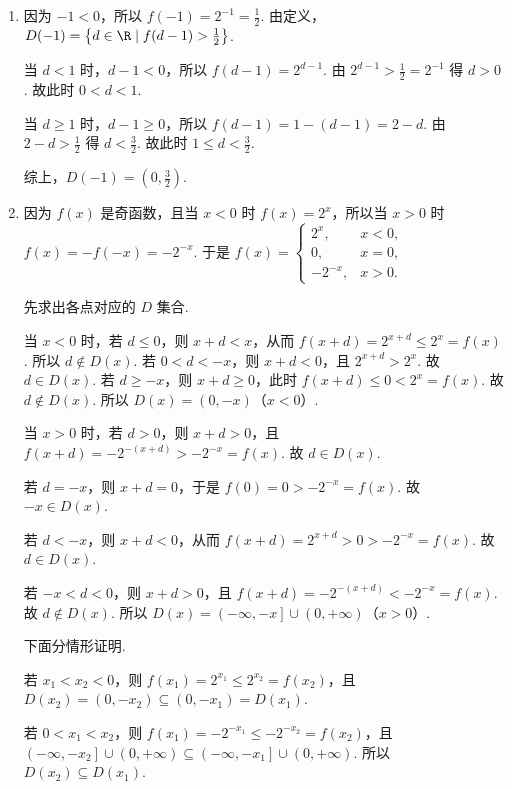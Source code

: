 \documentclass[UTF8,a4paper,oneside,11pt]{ctexbook}
\begin{document}
\begin{solution}
\begin{enumerate}
\item 因为 \(-1<0\)，所以 \(f(-1)=2^{-1}=\frac{1}{2}\). 由定义，\(D(-1)=\left\{ d\in\R \mid f(d-1)>\frac{1}{2} \right\}\).

当 \(d<1\) 时，\(d-1<0\)，所以 \(f(d-1)=2^{d-1}\). 由 \(2^{d-1}>\frac{1}{2}=2^{-1}\) 得 \(d>0\).
故此时 \(0<d<1\).

当 \(d\ge 1\) 时，\(d-1\ge 0\)，所以 \(f(d-1)=1-\left( d-1 \right)=2-d\). 由 \(2-d>\frac{1}{2}\) 得 \(d<\frac{3}{2}\).
故此时 \(1\le d<\frac{3}{2}\).

综上，\(D(-1)=\left( 0,\frac{3}{2} \right)\).

\item 因为 \(f(x)\) 是奇函数，且当 \(x<0\) 时 \(f(x)=2^x\)，所以当 \(x>0\) 时 \(f(x)=-f(-x)=-2^{-x}\). 于是
\(
f(x)=
\begin{cases}
2^x, & x<0,\\
0, & x=0,\\
-2^{-x}, & x>0.
\end{cases}
\)

先求出各点对应的 \(D\) 集合.

当 \(x<0\) 时，若 \(d\le 0\)，则 \(x+d<x\)，从而 \(f(x+d)=2^{x+d}\le 2^x=f(x)\). 所以 \(d\notin D(x)\). 若 \(0<d<-x\)，则 \(x+d<0\)，且 \(2^{x+d}>2^x\). 故 \(d\in D(x)\). 若 \(d\ge -x\)，则 \(x+d\ge 0\)，此时 \(f(x+d)\le 0<2^x=f(x)\). 故 \(d\notin D(x)\). 所以 \(D(x)=\left( 0,-x \right)\)（\(x<0\)）.

当 \(x>0\) 时，若 \(d>0\)，则 \(x+d>0\)，且 \(f(x+d)=-2^{-(x+d)}>-2^{-x}=f(x)\). 故 \(d\in D(x)\).

若 \(d=-x\)，则 \(x+d=0\)，于是 \(f(0)=0>-2^{-x}=f(x)\). 故 \(-x\in D(x)\).

若 \(d<-x\)，则 \(x+d<0\)，从而 \(f(x+d)=2^{x+d}>0>-2^{-x}=f(x)\). 故 \(d\in D(x)\).

若 \(-x<d<0\)，则 \(x+d>0\)，且 \(f(x+d)=-2^{-(x+d)}<-2^{-x}=f(x)\). 故 \(d\notin D(x)\). 所以 \(D(x)=\left( -\infty,-x \right]\cup \left( 0,+\infty \right)\)（\(x>0\)）.

下面分情形证明.

若 \(x_1<x_2<0\)，则 \(f(x_1)=2^{x_1}\le 2^{x_2}=f(x_2)\)，且 \(D(x_2)=\left( 0,-x_2 \right)\subseteq \left( 0,-x_1 \right)=D(x_1)\).

若 \(0<x_1<x_2\)，则 \(f(x_1)=-2^{-x_1}\le -2^{-x_2}=f(x_2)\)，且 \(\left( -\infty,-x_2 \right]\cup \left( 0,+\infty \right)\subseteq \left( -\infty,-x_1 \right]\cup \left( 0,+\infty \right)\). 所以 \(D(x_2)\subseteq D(x_1)\).


\end{enumerate}
\end{solution}
\end{document}
